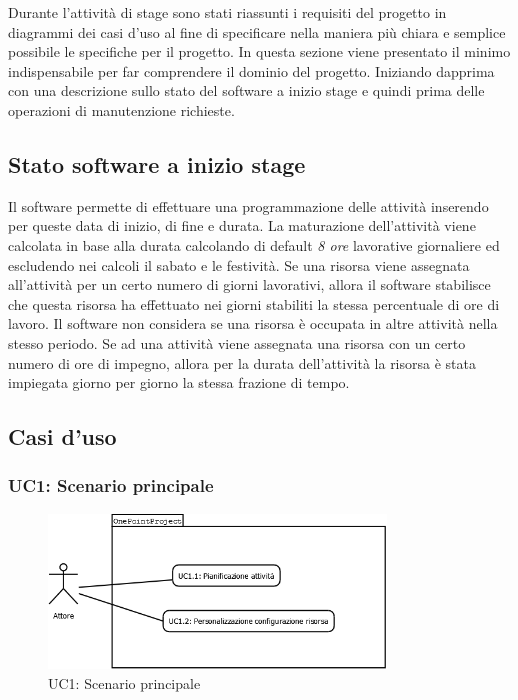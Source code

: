Durante l\textquoteright{}attivit\`{a} di stage sono stati riassunti i requisiti del progetto in diagrammi dei casi d\textquoteright{}uso al fine di specificare nella maniera pi\`{u} chiara e semplice possibile le specifiche per il progetto. In questa sezione viene presentato il minimo indispensabile per far comprendere il dominio del progetto. Iniziando dapprima con una descrizione sullo stato del software a inizio stage e quindi prima delle operazioni di manutenzione richieste.

\subsection{Stato software a inizio stage}
Il software permette di effettuare una programmazione delle attivit\`{a} inserendo per queste data di inizio, di fine e durata. La maturazione dell\textquoteright{}attivit\`{a} viene calcolata in base alla durata calcolando di default \textit{8 ore} lavorative giornaliere ed escludendo nei calcoli il sabato e le festivit\`{a}. Se una risorsa viene assegnata all\textquoteright{}attivit\`{a} per un certo numero di giorni lavorativi, allora il software stabilisce che questa risorsa ha effettuato nei giorni stabiliti la stessa percentuale di ore di lavoro. Il software non considera se una risorsa \`{e} occupata in altre attivit\`{a} nella stesso periodo. Se ad una attivit\`{a} viene assegnata una risorsa con un certo numero di ore di impegno, allora per la durata dell\textquoteright{}attivit\`{a} la risorsa \`{e} stata impiegata giorno per giorno la stessa frazione di tempo.

\subsection{Casi d\textquoteright{}uso}

\subsubsection[UC1: Scenario principale]{UC1: Scenario principale}
\begin{figure}[H]
\begin{center}
\includegraphics[width=0.80\textwidth]{img/UC/UC1.png}
\caption{UC1: Scenario principale}
\label{fig:UC1}
\end{center}
\end{figure}

